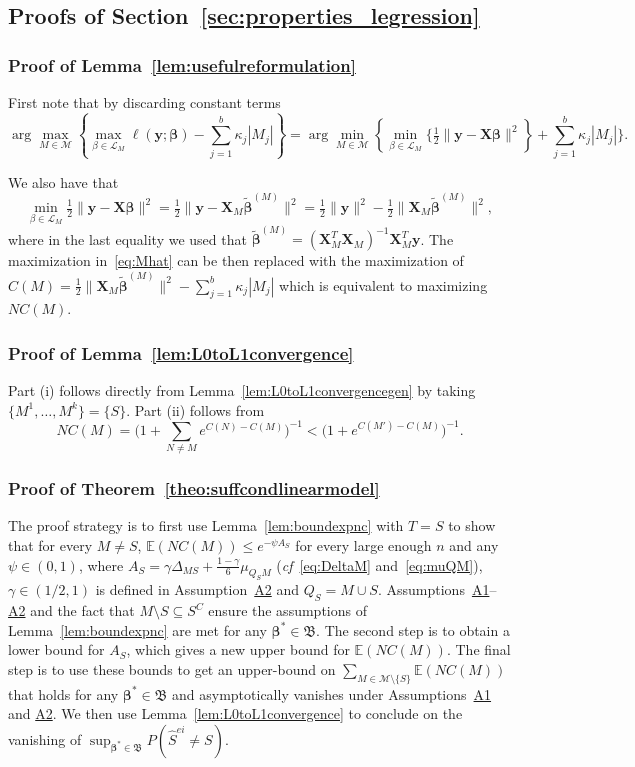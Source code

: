 \documentclass[
  12pt]{article}
\newcommand{\E}{\mathbb{E}}
\newcommand{\M}{\mathcal{M}}
\newcommand{\by}{\mathbf{y}}
\newcommand{\bbeta}{\boldsymbol{\beta}}
\newcommand{\bX}{\mathbf{X}}
\newcommand{\bB}{\mathfrak{B}}
\begin{document}
\subsection{Proofs of Section~\ref{sec:properties_legression}}\label{suppsec:proofseclinreg}
\subsubsection{Proof of Lemma~\ref{lem:usefulreformulation}}
	First note that by discarding constant terms 
 $$\arg\max_{M\in \M} \left\{\max_{\beta\in \mathcal{L}_M}\ell(\by; \bbeta)-\sum_{j=1}^b\kappa_j |M_j| \right\}=\arg\min_{M\in \M} \left\{\min_{\beta\in \mathcal{L}_M}\bigg\{ \tfrac{1}{2}\|\by-\bX\bbeta\|^2\right\}+\sum_{j=1}^b\kappa_j |M_j| \bigg\}.$$
 
 We also have that 
 $$\min_{\beta\in \mathcal{L}_M} \tfrac{1}{2}\|\by-\bX\bbeta\|^2=\tfrac{1}{2}\|\by-\bX_{\!\!M}\tilde{\bbeta}^{(M)}\|^2=\tfrac{1}{2}\|\by\|^2-\tfrac{1}{2}\|\bX_{\!\!M}\tilde{\bbeta}^{(M)}\|^2,$$
where in the last equality we used that $\tilde{\bbeta}^{(M)}= (\bX_M^T \bX_M)^{-1} \bX_M^T \by$.
 The maximization in~\eqref{eq:Mhat} can be then replaced with the maximization of $C(M)=\tfrac{1}{2}
 \|\bX_{\!\!M}\tilde{\bbeta}^{(M)}\|^2-\sum_{j=1}^b \kappa_j|M_j|$ which is equivalent to maximizing $NC(M)$.

\subsubsection{Proof of Lemma~\ref{lem:L0toL1convergence}}
Part (i) follows directly from Lemma~\ref{lem:L0toL1convergencegen} by taking $\{M^1,\ldots,M^k\}=\{S\}$.
Part (ii) follows from
$$NC(M)=\Big(1+\sum_{N \neq M} e^{C(N)-C(M)}\Big)^{-1}
< \big(1+ e^{C(M')-C(M)}\big)^{-1}.$$ 

\subsubsection{Proof of Theorem~\ref{theo:suffcondlinearmodel}} 
The proof strategy is to first use Lemma~\ref{lem:boundexpnc} with $T=S$ to show that for every $M\neq S$, $\E(NC(M)) \leq e^{-\psi A_S}$ for every large enough $n$ and any $\psi \in (0,1)$, where $A_S=\gamma\Delta_{MS}+\tfrac{1-\gamma}{6}\mu_{Q_SM}$ (\emph{cf}~\eqref{eq:DeltaM} and~\eqref{eq:muQM}), $\gamma\in(1/2,1)$ is defined in Assumption~\hyperlink{lab:A2}{A2} and $Q_S= M\cup S$. Assumptions~\hyperlink{lab:A1}{A1}--\hyperlink{lab:A2}{A2} and the fact that $M\setminus S\subseteq S^C$ ensure the 
assumptions of Lemma~\ref{lem:boundexpnc} are met for any $\bbeta^*\in \bB$. 
The second step is to obtain a lower bound for $A_S$, which gives a new upper bound for $\E(NC(M))$.
The final step is to use these bounds to get an upper-bound on $\sum_{M \in \M\setminus \{S\}} \E\left(NC(M)\right)$ that holds for any $\bbeta^*\in \bB$ and asymptotically vanishes under Assumptions~\hyperlink{lab:A1}{A1} and \hyperlink{lab:A2}{A2}. We then use Lemma~\ref{lem:L0toL1convergence} to conclude on the vanishing of $\sup_{\bbeta^*\in \bB}P(\hat{S}^{ei} \neq S)$. 
\end{document}
